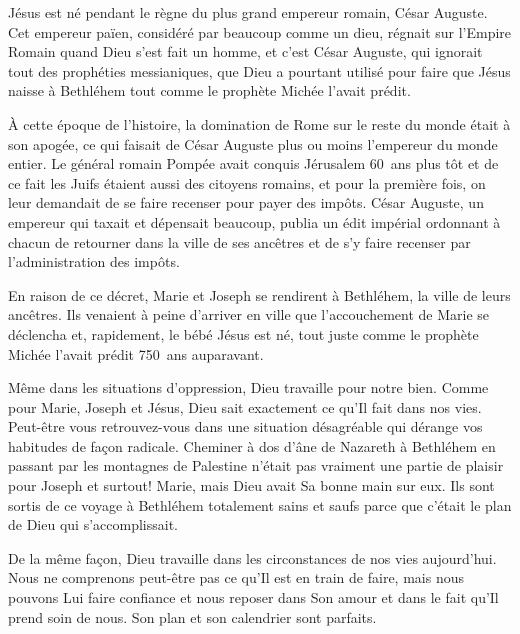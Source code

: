 

Jésus est né pendant le règne du plus grand empereur romain, César Auguste. Cet empereur païen, considéré par beaucoup comme un dieu, régnait sur l'Empire Romain quand Dieu s'est fait un homme, et c'est César Auguste, qui ignorait tout des prophéties messianiques, que Dieu a pourtant utilisé pour faire que Jésus naisse à Bethléhem tout comme le prophète Michée l'avait prédit.

À cette époque de l'histoire, la domination de Rome sur le reste du monde était à son apogée, ce qui faisait de César Auguste plus ou moins l'empereur du monde entier. Le général romain Pompée avait conquis Jérusalem 60~ans plus tôt et de ce fait les Juifs étaient aussi des citoyens romains, et pour la première fois, on leur demandait de se faire recenser pour payer des impôts. César Auguste, un empereur qui taxait et dépensait beaucoup, publia un édit impérial ordonnant à chacun de retourner dans la ville de ses ancêtres et de s'y faire recenser par l'administration des impôts.

En raison de ce décret, Marie et Joseph se rendirent à Bethléhem, la ville de leurs ancêtres. Ils venaient à peine d'arriver en ville que l'accouchement de Marie se déclencha et, rapidement, le bébé Jésus est né, tout juste comme le prophète Michée l'avait prédit 750~ans auparavant.

Même dans les situations d'oppression, Dieu travaille pour notre bien. Comme pour Marie, Joseph et Jésus, Dieu sait exactement ce qu'Il fait dans nos vies. Peut-être vous retrouvez-vous dans une situation désagréable qui dérange vos habitudes de façon radicale. Cheminer à dos d'âne de Nazareth à Bethléhem en passant par les montagnes de Palestine n'était pas vraiment une partie de plaisir pour Joseph et \ocadr surtout! \fcadr{} Marie, mais Dieu avait Sa bonne main sur eux. Ils sont sortis de ce voyage à Bethléhem totalement sains et saufs parce que c'était le plan de Dieu qui s'accomplissait.

De la même façon, Dieu travaille dans les circonstances de nos vies aujourd'hui. Nous ne comprenons peut-être pas ce qu'Il est en train de faire, mais nous pouvons Lui faire confiance et nous reposer dans Son amour et dans le fait qu'Il prend soin de nous. Son plan et son calendrier sont parfaits.


